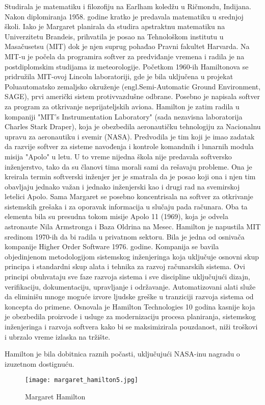 \documentclass[a4paper,12pt]{article}
\begin{document}
\begin{flushleft}
    Studirala je matematiku i filozofiju na Earlham koledžu u Ričmondu, Indijana. Nakon diplomiranja 1958. godine kratko je predavala matematiku u srednjoj školi. Iako je Margaret planirala da studira apstraktnu matematiku na Univerzitetu Brandeis, prihvatila je posao na Tehnološkom institutu u Masačusetsu (MIT) dok je njen suprug pohađao Pravni fakultet Harvarda. Na MIT-u je počela da programira softver za predviđanje vremena i radila je na postdiplomskim studijama iz meteorologije.
    Početkom 1960-ih Hamiltonova se pridružila MIT-ovoj Lincoln laboratoriji, gde je bila uključena u projekat Poluautomatsko zemaljsko okruženje (engl.Semi-Automatic Ground Environment, SAGE), prvi američki sistem protivvazdušne odbrane. Posebno je napisala softver za program za otkrivanje neprijateljskih aviona. Hamilton je zatim radila u kompaniji "MIT’s Instrumentation Laboratory" (sada nezavisna laboratorija Charles Stark Draper), koja je obezbedila aeronautičku tehnologiju za Nacionalnu upravu za aeronautiku i svemir (NASA). Predvodila je tim koji je imao zadatak da razvije softver za sisteme navođenja i kontrole komandnih i lunarnih modula misija "Apolo" u letu. U to vreme nijedna škola nije predavala softversko inženjerstvo, tako da su članovi tima morali sami da rešavaju probleme. Ona je kreirala termin softverski inženjer jer je smatrala da je posao koji ona i njen tim obavljaju jednako važan i jednako inženjerski kao i drugi rad na svemirskoj letelici Apolo. Sama Margaret se posebno koncentrisala na softver za otkrivanje sistemskih grešaka i za oporavak informacija u slučaju pada računara. Oba ta elementa bila su presudna tokom misije Apolo 11 (1969), koja je odvela astronaute Nila Armstronga i Baza Oldrina na Mesec. Hamilton je napustila MIT sredinom 1970-ih da bi radila u privatnom sektoru. Bila je jedna od osnivača kompanije Higher Order Software 1976. godine. Kompanija se bavila objedinjenom metodologijom sistemskog inženjeringa koja uključuje osnovni skup principa i standardni skup alata i tehnika za razvoj računarskih sistema. Ovi principi  obuhvataju sve faze razvoja sistema i sve discipline uključujući dizajn, verifikaciju, dokumentaciju, upravljanje i održavanje. Automatizovani alati služe da eliminišu mnoge moguće izvore ljudske greške u tranziciji razvoja sistema od koncepta do primene. Osnovala je Hamilton Technologies 10 godina kasnije koja je obezbedila proizvode i usluge za modernizaciju procesa planiranja, sistemskog inženjeringa i razvoja softvera kako bi se maksimizirala pouzdanost, niži troškovi i ubrzalo vreme izlaska na tržište.

    Hamilton je bila dobitnica raznih počasti, uključujući NASA-inu nagradu o izuzetnom dostignuću.
    \end{flushleft}
    \begin{figure}[h]
    \centering
    \texttt{[image: margaret\_hamilton5.jpg]}
    \caption{Margaret Hamilton}
    \label{fig:my_label}
\end{figure}
\end{document}
